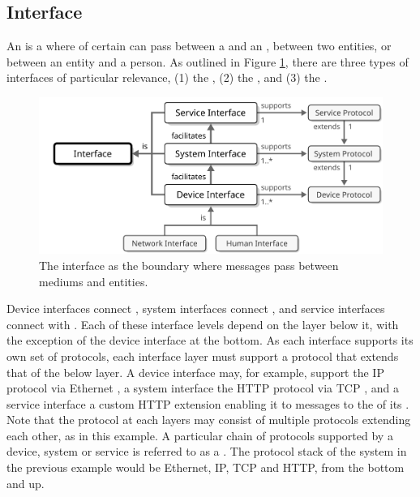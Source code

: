 \subsection{Interface}
\label{sec:concepts:interface}

An  is a  where  of certain  can pass between a  and an , between two entities, or between an entity and a person.
As outlined in Figure \ref{fig:interface}, there are three types of interfaces of particular relevance, (1) the , (2) the , and (3) the .

\begin{figure}[ht!]
  \centering
  \includegraphics[scale=0.9]{figures/interface}
  \caption{
    The interface as the boundary where messages pass between mediums and entities.
  }
  \label{fig:interface}
\end{figure}

Device interfaces connect , system interfaces connect , and service interfaces connect  with .
Each of these interface levels depend on the layer below it, with the exception of the device interface at the bottom.
As each interface supports its own set of protocols, each interface layer must support a protocol that extends that of the below layer.
A device interface may, for example, support the IP \cite{deering2017internet} protocol via Ethernet \cite{iso202188023}, a system interface the HTTP \cite{fielding2014hypertext} protocol via TCP \cite{postel1981transmission}, and a service interface a custom HTTP extension enabling it to  messages to the  of its .
Note that the protocol at each layers may consist of multiple protocols extending each other, as in this example.
A particular chain of protocols supported by a device, system or service is referred to as a .
The protocol stack of the system in the previous example would be Ethernet, IP, TCP and HTTP, from the bottom and up.

